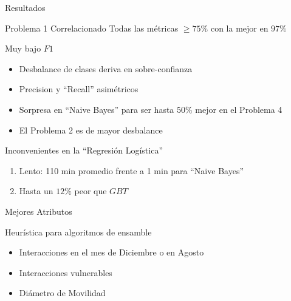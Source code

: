 \documentclass[xcolor=x11names]{beamer}
\begin{document}
\begin{frame}{Resultados}

	\begin{block}{ Problema 1 Correlacionado}
		Todas las métricas $\geq 75\%$ con la mejor en $97\%$
	\end{block}

	\begin{block}{Muy bajo $F1$}
		\begin{itemize}[]
			\item Desbalance de clases deriva en sobre-confianza
			\item Precision y ``Recall'' asimétricos
			\item Sorpresa en ``Naive Bayes'' para ser hasta $50\%$ mejor en el Problema 4
			\item El Problema 2 es de mayor desbalance
		\end{itemize}
	\end{block}

\begin{block}{Inconvenientes en la ``Regresión Logística''}
	\begin{enumerate}[I]
		\item Lento: 110 min promedio frente a 1 min para ``Naive Bayes''
		\item Hasta un $12\%$ peor que $GBT$
	\end{enumerate}
\end{block}

\end{frame}


\begin{frame}{Mejores Atributos}

		Heurística para algoritmos de ensamble

		\begin{itemize}
			\item Interacciones en el mes de Diciembre o en Agosto
			\item Interacciones vulnerables
			\item Diámetro de Movilidad
		\end{itemize}

\end{frame}

\end{document}
